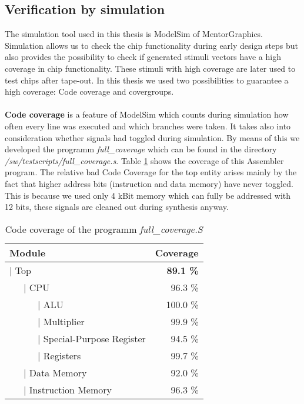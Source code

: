 \subsection{Verification by simulation}
The simulation tool used in this thesis is ModelSim of MentorGraphics. Simulation allows us to check the chip functionality during early design steps but also provides the possibility to check if generated stimuli vectors have a high coverage in chip functionality. These stimuli with high coverage are later used to test chips after tape-out. In this thesis we used two possibilities to guarantee a high coverage: Code coverage and covergroups. \\\\
\textbf{Code coverage}
is a feature of ModelSim which counts during simulation how often every line was executed and which branches were taken. It takes also into consideration whether signals had toggled during simulation. By means of this we developed the programm \textit{full\_coverage} which can be found in the directory \textit{/sw/testscripts/full\_coverage.s}. Table \ref{tab:code_coverage} shows the coverage of this Assembler program. The relative bad Code Coverage for the top entity arises mainly by the fact that higher address bits (instruction and data memory) have never toggled. This is because we used only 4 kBit memory which can fully be addressed with 12 bits, these signals are cleaned out during synthesis anyway. \\
\begin{table}[htbp]
 \caption{Code coverage of the programm \textit{full\_coverage.S}}
 \label{tab:code_coverage}
 \centering\begin{tabular}{l l l r} \toprule
\multicolumn{3}{l}{\textbf{Module}} & \textbf{Coverage} \\ \midrule
\multicolumn{3}{l}{| Top} & \textbf{89.1 \%} \\
\  & \multicolumn{2}{l}{| CPU} & 96.3 \% \\
\ & \ & | ALU & 100.0 \% \\
\ & \ & | Multiplier & 99.9 \% \\
\ & \ & | Special-Purpose Register & 94.5 \% \\
\ & \ & | Registers & 99.7 \% \\
\ & \multicolumn{2}{l}{| Data Memory} & 92.0 \% \\
\  & \multicolumn{2}{l}{| Instruction Memory} & 96.3 \% \\ \bottomrule
 \end{tabular}
\end{table}
